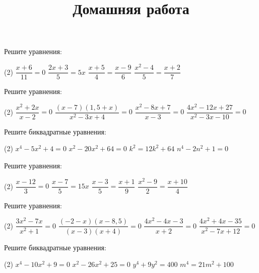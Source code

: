 \begin{consultation}
	\begin{listofex}
		\item Решите уравнения:
		\begin{tasks}(2)
			\task \( \dfrac{x+6}{11}=0 \)
			\task \( \dfrac{2x+3}{5}=5x \)
			\task \( \dfrac{x+5}{4}=\dfrac{x-9}{6} \)
			\task \( \dfrac{x^2-4}{5}=\dfrac{x+2}{7} \)
		\end{tasks}
		\item Решите уравнения:
			\begin{tasks}(2)
				\task \( \dfrac{x^2+2x}{x-2}=0 \)
				\task \( \dfrac{(x-7)(1,5+x)}{x^2-3x+4}=0 \)
				\task \( \dfrac{x^2-8x+7}{x-3}=0 \)
				\task \( \dfrac{4x^2-12x+27}{x^2-3x-10}=0 \)
			\end{tasks}
		\item Решите биквадратные уравнения:
		\begin{tasks}(2)
			\task \( x^4-5x^2+4=0 \)
			\task \( x^2-20x^2+64=0 \)
			\task \( k^2=12k^2+64 \)
			\task \( n^4-2n^2+1=0 \)
		\end{tasks}
	\end{listofex}
	\newpage
	\title{Домашняя работа}
	\begin{listofex}
		\item Решите уравнения:
		\begin{tasks}(2)
			\task \( \dfrac{x-12}{3}=0 \)
			\task \( \dfrac{x-7}{5}=15x \)
			\task \( \dfrac{x-3}{5}=\dfrac{x+1}{9} \)
			\task \( \dfrac{x^2-9}{2}=\dfrac{x+10}{4} \)
		\end{tasks}
		\item Решите уравнения:
		\begin{tasks}(2)
			\task \( \dfrac{3x^2-7x}{x^2+1}=0 \)
			\task \( \dfrac{(-2-x)(x-8,5)}{(x-3)(x+4)}=0 \)
			\task \( \dfrac{4x^2-4x-3}{x+2}=0 \)
			\task \( \dfrac{4x^2+4x-35}{x^2-7x+12}=0 \)
		\end{tasks}
		\item Решите биквадратные уравнения:
		\begin{tasks}(2)
			\task \( x^4-10x^2+9=0 \)
			\task \( x^2-26x^2+25=0 \)
			\task \( y^4+9y^2=400 \)
			\task \( m^4=21m^2+100 \)
		\end{tasks}
	\end{listofex}
\end{consultation}
